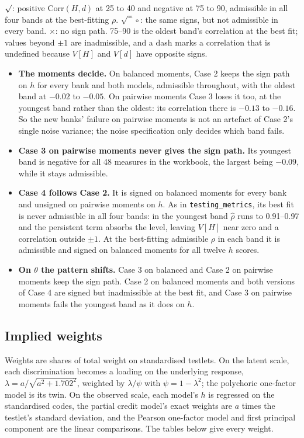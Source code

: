 \documentclass[11pt]{article}
\newcommand{\code}[1]{\texttt{\small #1}}
\begin{document}


{\footnotesize $\surd$: positive $\mathrm{Corr}(H,d)$ at 25 to 40 and
negative at 75 to 90, admissible in all four bands at the best-fitting
$\rho$. $\surd^{\circ}$: the same signs, but not admissible in every band.
$\times$: no sign path. 75--90 is the oldest band's correlation at the best
fit; values beyond $\pm1$ are inadmissible, and a dash marks a correlation that
is undefined because $V[H]$ and $V[d]$ have opposite signs.\par}

\begin{itemize}\itemsep2pt
\item \textbf{The moments decide.} On balanced moments, Case 2 keeps the sign
path on $h$ for every bank and both models, admissible throughout, with the
oldest band at $-0.02$ to $-0.05$. On pairwise moments Case 3 loses it too, at
the youngest band rather than the oldest: its correlation there is $-0.13$ to
$-0.16$. So the new banks' failure on pairwise moments is not an artefact of
Case 2's single noise variance; the noise specification only decides which
band fails.
\item \textbf{Case 3 on pairwise moments never gives the sign path.} Its
youngest band is negative for all 48 measures in the workbook, the largest
being $-0.09$, while it stays admissible.
\item \textbf{Case 4 follows Case 2.} It is signed on balanced moments for
every bank and unsigned on pairwise moments on $h$. As in
\code{testing\_metrics}, its best fit is never admissible in all four bands:
in the youngest band $\hat\rho$ runs to 0.91--0.97 and the persistent term
absorbs the level, leaving $V[H]$ near zero and a correlation outside
$\pm1$. At the best-fitting admissible $\rho$ in each band it is admissible and
signed on balanced moments for all twelve $h$ scores.
\item \textbf{On $\theta$ the pattern shifts.} Case 3 on balanced and Case 2
on pairwise moments keep the sign path. Case 2 on balanced moments and both
versions of Case 4 are signed but inadmissible at the best fit, and Case 3 on
pairwise moments fails the youngest band as it does on $h$.
\end{itemize}

\subsection{Implied weights}
Weights are shares of total weight on standardised testlets. On the latent
scale, each discrimination becomes a loading on the underlying response,
$\lambda=a/\sqrt{a^2+1.702^2}$, weighted by $\lambda/\psi$ with
$\psi=1-\lambda^2$; the polychoric one-factor model is its twin. On the
observed scale, each model's $h$ is regressed on the standardised codes, the
partial credit model's exact weights are $a$ times the testlet's standard
deviation, and the Pearson one-factor model and first principal component are
the linear comparisons. The tables below give every weight.
\end{document}
